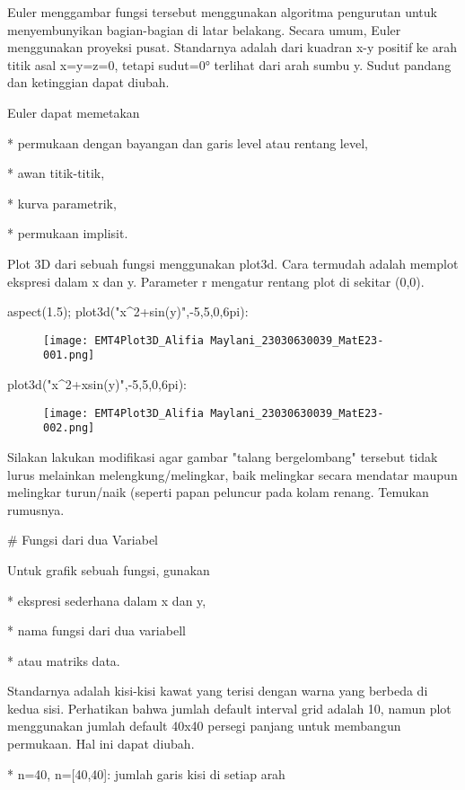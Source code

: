 \documentclass{article}
\begin{document}
Euler menggambar fungsi tersebut menggunakan algoritma pengurutan
untuk menyembunyikan bagian-bagian di latar belakang. Secara umum,
Euler menggunakan proyeksi pusat. Standarnya adalah dari kuadran x-y
positif ke arah titik asal x=y=z=0, tetapi sudut=0° terlihat dari arah
sumbu y. Sudut pandang dan ketinggian dapat diubah.


Euler dapat memetakan


* 
permukaan dengan bayangan dan garis level atau rentang level,

* 
awan titik-titik,

* 
kurva parametrik,

* 
permukaan implisit.


Plot 3D dari sebuah fungsi menggunakan plot3d. Cara termudah adalah
memplot ekspresi dalam x dan y. Parameter r mengatur rentang plot di
sekitar (0,0).


\>aspect(1.5); plot3d("x^2+sin(y)",-5,5,0,6\*pi):


\begin{figure}
    \centering
    \texttt{[image: EMT4Plot3D\_Alifia Maylani\_23030630039\_MatE23-001.png]}
    \caption{}
    \label{fig:enter-label}
\end{figure}

\>plot3d("x^2+x\*sin(y)",-5,5,0,6\*pi):
\begin{figure}
    \centering
    \texttt{[image: EMT4Plot3D\_Alifia Maylani\_23030630039\_MatE23-002.png]}
    \caption{}
    \label{fig:enter-label}
\end{figure}

Silakan lakukan modifikasi agar gambar "talang bergelombang" tersebut tidak lurus melainkan melengkung/melingkar, baik
melingkar secara mendatar maupun melingkar turun/naik (seperti papan peluncur pada kolam renang. Temukan rumusnya.


# Fungsi dari dua Variabel

Untuk grafik sebuah fungsi, gunakan


* 
ekspresi sederhana dalam x dan y,

* 
nama fungsi dari dua variabell

* 
atau matriks data.


Standarnya adalah kisi-kisi kawat yang terisi dengan warna yang
berbeda di kedua sisi. Perhatikan bahwa jumlah default interval grid
adalah 10, namun plot menggunakan jumlah default 40x40 persegi panjang
untuk membangun permukaan. Hal ini dapat diubah.


* 
n=40, n=[40,40]: jumlah garis kisi di setiap arah
\end{document}
